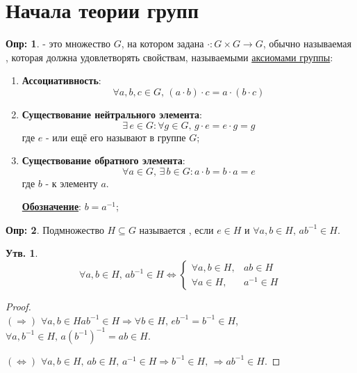 \documentclass[12pt]{article}
\newcommand{\RN}[1]{%
	\textup{\uppercase\expandafter{\romannumeral#1}}%
}
\theoremstyle{definition}
\newtheorem{defn}{Опр:}
\newtheorem{prop}{Утв.}
\begin{document}
\lhead{Алгебра-\RN{1}}
\section*{Начала теории групп}
\begin{defn}
	 - это множество $G$, на котором задана  $\cdot \colon G \times G \to G$, обычно называемая , которая должна удовлетворять свойствам, называемыми \uline{аксиомами группы}:
	\begin{enumerate}[label=\arabic*)]
		\item \textbf{Ассоциативность}: 
		$$
			\forall a,b,c \in G,\, (a \cdot b)\cdot c = a\cdot (b \cdot c)
		$$
		\item \textbf{Существование нейтрального элемента}: 
		$$	
			\exists \, e \in G \colon \forall g \in G, \, g \cdot e = e \cdot g = g
		$$
		где $e$ -  или ещё его называют  в группе $G$;
		\item \textbf{Существование обратного элемента}:
		$$
			\forall a \in G, \, \exists \, b \in G \colon a \cdot b = b \cdot a = e	
		$$
		где $b$ -  к элементу $a$.
		
		\textbf{\uline{Обозначение}}: $b = a^{-1}$;
	\end{enumerate}
\end{defn}

\begin{defn}
	Подмножество $H \subseteq G$ называется , если $e \in H$ и $\forall a,b \in H, \, ab^{-1} \in H$.
\end{defn}
\begin{prop}
	$$
		\forall a,b \in H, \, ab^{-1} \in H \Leftrightarrow
		\begin{cases}
			\forall a,b \in H, & ab \in H \\
			\forall a \in H, & a^{-1} \in H
		\end{cases}
	$$
\end{prop}
\begin{proof}\hfill\\
	$(\Rightarrow)$ $\forall a,b\in H ab^{-1} \in H \Rightarrow \forall b \in H, \, eb^{-1} = b^{-1} \in H$, $\forall a,b^{-1} \in H, \, a(b^{-1})^{-1} = ab \in H$.
	
	$(\Leftrightarrow)$ $\forall a,b \in H, \, ab \in H, \, a^{-1} \in H \Rightarrow b^{-1} \in H,\, \Rightarrow ab^{-1} \in H$.
\end{proof}
\end{document}
